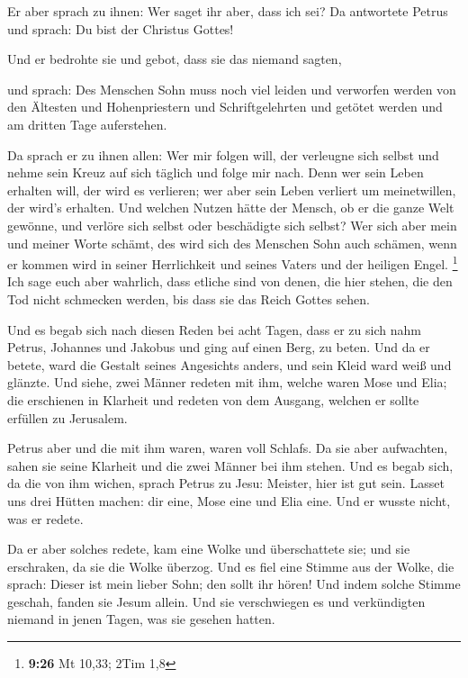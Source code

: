  Er aber sprach zu ihnen: Wer saget ihr aber, dass ich
sei? Da antwortete Petrus und sprach: Du bist der Christus Gottes!

 Und er bedrohte sie und gebot, dass sie das niemand
sagten,

 und sprach: Des Menschen Sohn muss noch viel leiden und
verworfen werden von den Ältesten und Hohenpriestern und
Schriftgelehrten und getötet werden und am dritten Tage auferstehen.

 Da sprach er zu ihnen allen: Wer mir folgen will, der
verleugne sich selbst und nehme sein Kreuz auf sich täglich und folge
mir nach.  Denn wer sein Leben erhalten will, der wird es
verlieren; wer aber sein Leben verliert um meinetwillen, der wird's
erhalten.  Und welchen Nutzen hätte der Mensch, ob er die
ganze Welt gewönne, und verlöre sich selbst oder beschädigte sich
selbst?  Wer sich aber mein und meiner Worte schämt, des
wird sich des Menschen Sohn auch schämen, wenn er kommen wird in seiner
Herrlichkeit und seines Vaters und der heiligen Engel. \footnote{\textbf{9:26}
  Mt 10,33; 2Tim 1,8}  Ich sage euch aber wahrlich, dass
etliche sind von denen, die hier stehen, die den Tod nicht schmecken
werden, bis dass sie das Reich Gottes sehen.

 Und es begab sich nach diesen Reden bei acht Tagen, dass
er zu sich nahm Petrus, Johannes und Jakobus und ging auf einen Berg, zu
beten.  Und da er betete, ward die Gestalt seines
Angesichts anders, und sein Kleid ward weiß und glänzte. 
Und siehe, zwei Männer redeten mit ihm, welche waren Mose und Elia;
 die erschienen in Klarheit und redeten von dem Ausgang,
welchen er sollte erfüllen zu Jerusalem.

 Petrus aber und die mit ihm waren, waren voll Schlafs.
Da sie aber aufwachten, sahen sie seine Klarheit und die zwei Männer bei
ihm stehen.  Und es begab sich, da die von ihm wichen,
sprach Petrus zu Jesu: Meister, hier ist gut sein. Lasset uns drei
Hütten machen: dir eine, Mose eine und Elia eine. Und er wusste nicht,
was er redete.

 Da er aber solches redete, kam eine Wolke und
überschattete sie; und sie erschraken, da sie die Wolke überzog.
 Und es fiel eine Stimme aus der Wolke, die sprach:
Dieser ist mein lieber Sohn; den sollt ihr hören!  Und
indem solche Stimme geschah, fanden sie Jesum allein. Und sie
verschwiegen es und verkündigten niemand in jenen Tagen, was sie gesehen
hatten.

